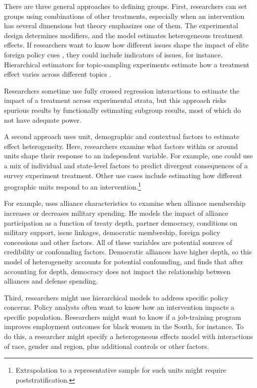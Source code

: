 \documentclass[12pt]{article}
\begin{document}
There are three general approaches to defining groups.  
First, researchers can set groups using combinations of other treatments, especially when an intervention has several dimensions but theory emphasizes one of them. 
The experimental design determines modifiers, and the model estimates heterogeneous treatment effects.   
If researchers want to know how different issues shape the impact of elite foreign policy cues \citep{GuisingerSaunders2017}, they could include indicators of issues, for instance.
Hierarchical estimators for topic-sampling experiments estimate how a treatment effect varies across different topics \citep{CliffordRainey2023}. 


Researchers sometime use fully crossed regression interactions to estimate the impact of a treatment across experimental strata, but this approach risks spurious results by functionally estimating subgroup results, most of which do not have adequate power. 


A second approach uses unit, demographic and contextual factors to estimate effect heterogeneity. 
Here, researchers examine what factors within or around units shape their response to an independent variable.
For example, one could use a mix of individual and state-level factors to predict divergent consequences of a survey experiment treatment. 
Other use cases include estimating how different geographic units respond to an intervention.\footnote{Extrapolation to a representative sample for such units might require poststratification.}


For example, \citet{Alley2021isq} uses alliance characteristics to examine when alliance membership increases or decreases military spending.
He models the impact of alliance participation as a function of treaty depth, partner democracy, conditions on military support, issue linkages, democratic membership, foreign policy concessions and other factors. 
All of these variables are potential sources of credibility or confounding factors.
Democratic alliances have higher depth, so this model of heterogeneity accounts for potential confounding, and finds that after accounting for depth, democracy does not impact the relationship between alliances and defense spending. 


Third, researchers might use hierarchical models to address specific policy concerns.
Policy analysts often want to know how an intervention impacts a specific population. 
Researchers might want to know if a job-training program improves employment outcomes for black women in the South, for instance.  
To do this, a researcher might specify a heterogeneous effects model with interactions of race, gender and region, plus additional controls or other factors. 
\end{document}
